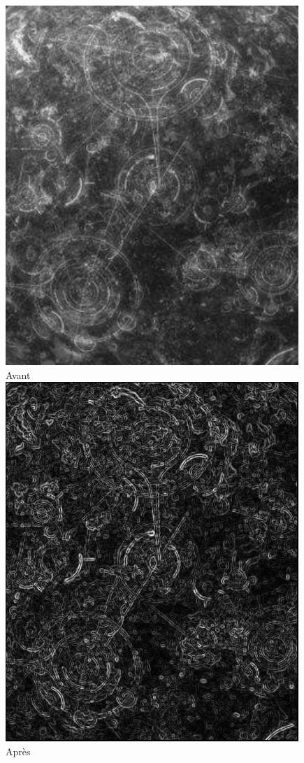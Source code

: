 	\begin{figure}[h]
	\centering
		\begin{multicols}{2}
		\includegraphics[scale=0.6]{images/U1_surface.png}
		Avant
		\includegraphics[scale=0.6]{images/MissionU1.png}
		Après
		\end{multicols}
	\end{figure}
	\vspace{-0.9cm}

